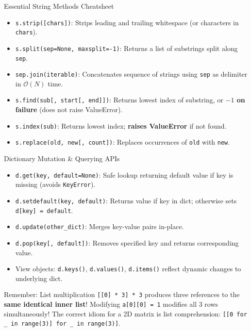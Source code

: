 \begin{formulabox}{Essential String Methods Cheatsheet}
\begin{itemize}[leftmargin=1.5em, itemsep=2pt]
    \item \texttt{s.strip([chars])}: Strips leading and trailing whitespace (or characters in \texttt{chars}).
    \item \texttt{s.split(sep=None, maxsplit=-1)}: Returns a list of substrings split along \texttt{sep}.
    \item \texttt{sep.join(iterable)}: Concatenates sequence of strings using \texttt{sep} as delimiter in $\mathcal{O}(N)$ time.
    \item \texttt{s.find(sub[, start[, end]])}: Returns lowest index of substring, or \textbf{$-1$ on failure} (does not raise ValueError).
    \item \texttt{s.index(sub)}: Returns lowest index; \textbf{raises ValueError} if not found.
    \item \texttt{s.replace(old, new[, count])}: Replaces occurrences of \texttt{old} with \texttt{new}.
\end{itemize}
\end{formulabox}

\begin{formulabox}{Dictionary Mutation \& Querying APIs}
\begin{itemize}[leftmargin=1.5em, itemsep=2pt]
    \item \texttt{d.get(key, default=None)}: Safe lookup returning default value if key is missing (avoids \texttt{KeyError}).
    \item \texttt{d.setdefault(key, default)}: Returns value if key in dict; otherwise sets \texttt{d[key] = default}.
    \item \texttt{d.update(other\_dict)}: Merges key-value pairs in-place.
    \item \texttt{d.pop(key[, default])}: Removes specified key and returns corresponding value.
    \item View objects: \texttt{d.keys()}, \texttt{d.values()}, \texttt{d.items()} reflect dynamic changes to underlying dict.
\end{itemize}
\end{formulabox}

\begin{memorytip}
Remember: List multiplication \texttt{[[0] * 3] * 3} produces three references to the \textbf{same identical inner list}! Modifying \texttt{a[0][0] = 1} modifies all 3 rows simultaneously! The correct idiom for a 2D matrix is list comprehension: \texttt{[[0 for \_ in range(3)] for \_ in range(3)]}.
\end{memorytip}
